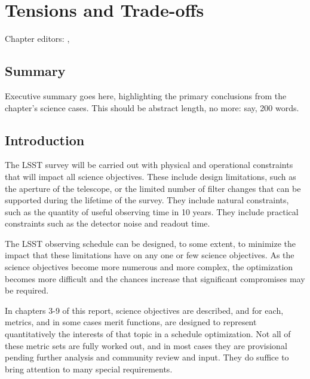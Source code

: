 \chapter[Tensions and Trade-offs]{Tensions and Trade-offs}
\def\chpname{tradeoffs}\label{chp:\chpname}

Chapter editors:
,

\section*{Summary}

Executive summary goes here, highlighting the primary conclusions from
the chapter's science cases. This should be abstract length, no more:
say, 200 words.


\section{Introduction}

The LSST survey will be carried out with physical and operational
constraints that will impact all science objectives.  These include
design limitations, such as the aperture of the telescope, or the
limited number of filter changes that can be supported during the
lifetime of the survey.  They include natural constraints, such as the
quantity of useful observing time in 10 years. They include practical
constraints such as the detector noise and readout time.

The LSST observing schedule can be designed, to some extent, to minimize
the impact that these limitations have on any one or few science
objectives. As the science objectives become more numerous and more
complex, the optimization becomes more difficult and the chances
increase that significant compromises may be required.

In chapters 3-9 of this report, science objectives are described, and
for each, metrics, and in some cases merit functions, are designed to
represent quantitatively the interests of that topic in a schedule
optimization.  Not all of these metric sets are fully worked out, and in
most cases they are provisional pending further analysis and community
review and input.  They do suffice to bring attention to many special
requirements.


